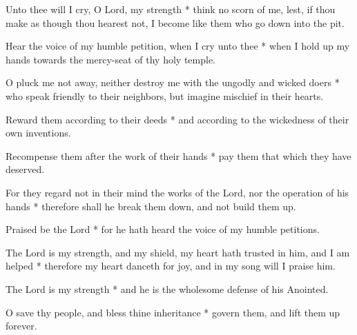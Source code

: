 Unto thee will I cry, O Lord, my strength * think no scorn of me, lest, if thou make as though thou hearest not, I become like them who go down into the pit.

Hear the voice of my humble petition, when I cry unto thee * when I hold up my hands towards the mercy-seat of thy holy temple.

O pluck me not away, neither destroy me with the ungodly and wicked doers * who speak friendly to their neighbors, but imagine mischief in their hearts.

Reward them according to their deeds * and according to the wickedness of their own inventions.

Recompense them after the work of their hands * pay them that which they have deserved.

For they regard not in their mind the works of the Lord, nor the operation of his hands * therefore shall he break them down, and not build them up.

Praised be the Lord * for he hath heard the voice of my humble petitions.

The Lord is my strength, and my shield, my heart hath trusted in him, and I am helped * therefore my heart danceth for joy, and in my song will I praise him.

The Lord is my strength * and he is the wholesome defense of his Anointed.

O save thy people, and bless thine inheritance * govern them, and lift them up forever.